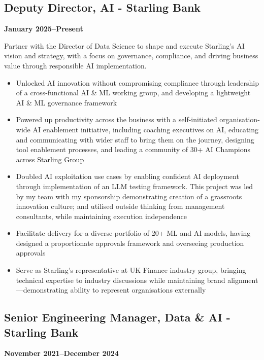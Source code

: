 \documentclass[a4paper]{scrartcl}
\begin{document}
\subsection*{Deputy Director, AI - Starling Bank}
\textbf{January 2025--Present}

Partner with the Director of Data Science to shape and execute Starling's AI vision and strategy, with a focus on governance, compliance, and driving business value through responsible AI implementation.
\begin{itemize}
	\item Unlocked AI innovation without compromising compliance through leadership of a cross-functional AI \& ML working group, and developing a lightweight AI \& ML governance framework
	\item Powered up productivity across the business with a self-initiated organisation-wide AI enablement initiative, including coaching executives on AI, educating and communicating with wider staff to bring them on the journey, designing tool enablement processes, and leading a community of 30+ AI Champions across Starling Group
	\item Doubled AI exploitation use cases by enabling confident AI deployment through implementation of an LLM testing framework. This project was led by my team with my sponsorship demonstrating creation of a grassroots innovation culture; and utilised outside thinking from management consultants, while maintaining execution independence
	\item Facilitate delivery for a diverse portfolio of 20+ ML and AI models, having designed a proportionate approvals framework and overseeing production approvals
	\item Serve as Starling's representative at UK Finance industry group, bringing technical expertise to industry discussions while maintaining brand alignment—demonstrating ability to represent organisations externally
\end{itemize}

\subsection*{Senior Engineering Manager, Data \& AI - Starling Bank}
\textbf{November 2021--December 2024}
\end{document}
